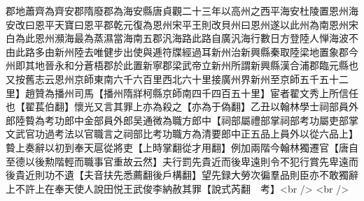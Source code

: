 郡地蕭齊為齊安郡隋廢郡為海安縣唐貞觀二十三年以高州之西平海安杜陵置恩州海安改曰恩平天寶曰恩平郡乾元復為恩州宋平王則改貝州曰恩州遂以此州為南恩州宋白為此恩州瀕海最為蒸濕當海南五郡汎海路此路自廣汎海行數日方登陸人惮海波不由此路多由新州陸去唯健步出使與逓符牒經過耳新州治新興縣秦取陸梁地置象郡今州即其地晉永和分蒼梧郡於此置新寧郡梁武帝立新州所謂新興縣漢合浦郡臨元縣也又按舊志云恩州京師東南六千六百里西北六十里接廣州界新州至京師五千五十二里】趙贊為播州司馬【播州隋牂柯縣京師南四千四百五十里】宦者翟文秀上所信任也【翟萇伯翻】懷光又言其罪上亦為殺之【亦為于偽翻】乙丑以翰林學士祠部員外郎陸䞇為考功郎中金部員外郎吴通微為職方郎中【祠部屬禮部掌祠部考功屬吏部掌文武官功過考法以官職言之祠部比考功職方為清要郎中正五品上員外以從六品上】䞇上奏辭以初到奉天扈從將吏【上時掌翻從才用翻】例加兩階今翰林獨遷官【唐自至德以後勲階輕而職事官重故云然】夫行罰先貴近而後卑遠則令不犯行賞先卑遠而後貴近則功不遺【夫音扶先悉薦翻後戶構翻】望先録大勞次徧羣品則臣亦不敢獨辭上不許上在奉天使人說田悦王武俊李納赦其罪【說式芮翻　考】<br />
<br />
